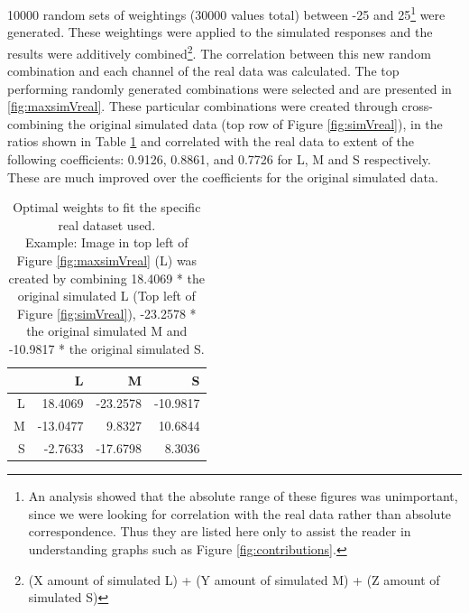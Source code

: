 10000 random sets of weightings (30000 values total) between -25 and 25\footnote{An analysis showed that the absolute range of these figures was unimportant, since we were looking for correlation with the real data rather than absolute correspondence. Thus they are listed here only to assist the reader in understanding graphs such as Figure \ref{fig:contributions}.} were generated. These weightings were applied to the simulated responses and the results were additively combined\footnote{(X amount of simulated L) + (Y amount of simulated M) + (Z amount of simulated S)}. The correlation between this new random combination and each channel of the real data was calculated. The top performing randomly generated combinations were selected and are presented in \ref{fig:maxsimVreal}. These particular combinations were created through cross-combining the original simulated data (top row of Figure \ref{fig:simVreal}), in the ratios shown in Table \ref{tab:crosscomb} and correlated with the real data to extent of the following coefficients: 0.9126, 0.8861, and 0.7726 for L, M and S respectively. These are much improved over the coefficients for the original simulated data.


\begin{table}[hbtp]
\begin{tabular}{|r|r|r|r|}
\hline
 & L & M & S \\ \hline
L & 18.4069 & -23.2578 & -10.9817 \\ \hline
M & -13.0477 & 9.8327 & 10.6844 \\ \hline
S & -2.7633 & -17.6798 & 8.3036 \\ \hline
\end{tabular} %
\caption{Optimal weights to fit the specific real dataset used. \\ Example: Image in top left of Figure \ref{fig:maxsimVreal} (L) was created by combining 18.4069 * the original simulated L (Top left of Figure \ref{fig:simVreal}), -23.2578 * the original simulated M and -10.9817 * the original simulated S.}
\label{tab:crosscomb}
\end{table}

